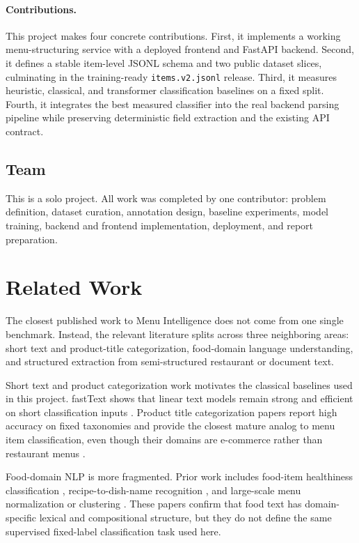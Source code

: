 \documentclass{article}
\begin{document}
\paragraph{Contributions.}
This project makes four concrete contributions. First, it implements a working
menu-structuring service with a deployed frontend and FastAPI backend. Second,
it defines a stable item-level JSONL schema and two public dataset slices,
culminating in the training-ready \texttt{items.v2.jsonl} release. Third, it
measures heuristic, classical, and transformer classification baselines on a
fixed split. Fourth, it integrates the best measured classifier into the real
backend parsing pipeline while preserving deterministic field extraction and
the existing API contract.

\subsection{Team}

This is a solo project. All work was completed by one contributor: problem
definition, dataset curation, annotation design, baseline experiments, model
training, backend and frontend implementation, deployment, and report
preparation.

\section{Related Work}

The closest published work to Menu Intelligence does not come from one single
benchmark. Instead, the relevant literature splits across three neighboring
areas: short text and product-title categorization, food-domain language
understanding, and structured extraction from semi-structured restaurant or
document text.

Short text and product categorization work motivates the classical baselines
used in this project. fastText shows that linear text models remain strong and
efficient on short classification inputs \cite{joulin-etal-2017-bag}. Product
title categorization papers report high accuracy on fixed taxonomies and
provide the closest mature analog to menu item classification, even though
their domains are e-commerce rather than restaurant menus
\cite{xia-etal-2017-large,cevahir-murakami-2016-large}.

Food-domain NLP is more fragmented. Prior work includes food-item healthiness
classification \cite{wiegand-klakow-2013-towards}, recipe-to-dish-name
recognition \cite{hu-etal-2023-diner}, and large-scale menu normalization or
clustering \cite{latif-etal-2025-restaurant}. These papers confirm that food
text has domain-specific lexical and compositional structure, but they do not
define the same supervised fixed-label classification task used here.
\end{document}
